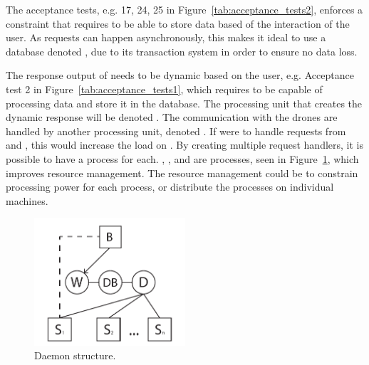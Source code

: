 The acceptance tests, e.g. 17, 24, 25 in Figure~\ref{tab:acceptance_tests2}, enforces a constraint that requires  to be able to store data based of the interaction of the user.
As requests can happen asynchronously, this makes it ideal to use a database denoted , due to its transaction system in order to ensure no data loss.

The response output of  needs to be dynamic based on the user, e.g. Acceptance test 2 in Figure~\ref{tab:acceptance_tests1}, which requires  to be capable of processing data and store it in the database.
The processing unit that creates the dynamic response will be denoted .
The communication with the drones are handled by another processing unit, denoted .
If  were to handle requests from  and , this would increase the load on .
By creating multiple request handlers, it is possible to have a process for each. , , and  are processes, seen in Figure~\ref{fig:daemon_structure}, which improves resource management.
The resource management could be to constrain processing power for each process, or distribute the processes on individual machines.

\begin{figure}[htb]
    \centering
    \includegraphics[width=0.5\textwidth]{gfx/daemon_structure.pdf}
    \caption{Daemon structure.}
    \label{fig:daemon_structure}
\end{figure}


